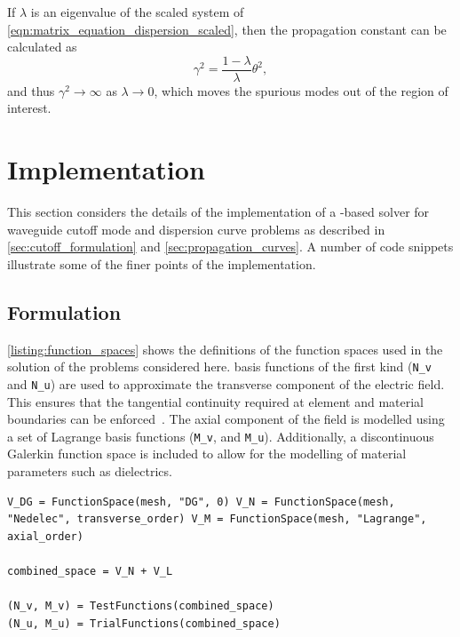 If $\lambda$ is an eigenvalue of the scaled system of
\eqref{eqn:matrix_equation_dispersion_scaled}, then the propagation constant can be
calculated as
\begin{equation}
    \gamma^2 = \frac{1 - \lambda}{\lambda}\theta^2,
\end{equation}
and thus $\gamma^2 \rightarrow \infty$ as $\lambda \rightarrow 0$, which moves the spurious modes out of the region of interest. 

\section{Implementation}
\label{sec:Implementation}

This section considers the details of the
implementation of a \fenics-based solver for waveguide cutoff mode and
dispersion curve problems as described in \ref{sec:cutoff_formulation}
and \ref{sec:propagation_curves}. A number of code snippets illustrate
some of the finer points of the implementation.

\subsection{Formulation}
\lstlistingname{} \ref{listing:function_spaces} shows the definitions of the function spaces used in the solution of the problems considered here. \nedelec{} basis functions of the first kind ({\tt N\_v} and {\tt N\_u}) are used to approximate the transverse component of the electric field. This ensures that the tangential continuity required at element and material boundaries can be enforced~\cite{Jin2002}.  The axial component of the field is modelled using a set of Lagrange basis functions ({\tt M\_v}, and {\tt M\_u}). Additionally, a discontinuous Galerkin function space is included to allow for the modelling of material parameters such as dielectrics.
\begin{lstlisting}[float=ht,caption=Function spaces and basis functions.,label=listing:function_spaces]
V_DG = FunctionSpace(mesh, "DG", 0) V_N = FunctionSpace(mesh,
"Nedelec", transverse_order) V_M = FunctionSpace(mesh, "Lagrange",
axial_order)

combined_space = V_N + V_L

(N_v, M_v) = TestFunctions(combined_space)
(N_u, M_u) = TrialFunctions(combined_space)
\end{lstlisting}

